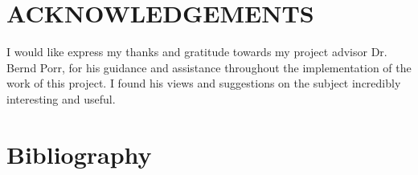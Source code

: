 \documentclass[11pt, a4paper, onecolumn]{article} %
\begin{document}
\newpage
\section*{ACKNOWLEDGEMENTS}
I would like express my thanks and gratitude towards my project advisor Dr. Bernd Porr, for his guidance and assistance throughout the implementation of the work of this project. I found his views and suggestions on the subject incredibly interesting and useful. 
\newpage
\tableofcontents %
\newpage
\listoffigures %

\newpage


\newpage


\newpage


\newpage


\newpage





\newpage
\section{Bibliography}
\printbibliography%
%

%
%
\end{document}
